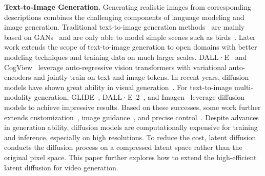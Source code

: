 \documentclass{article}
\begin{document}
\noindent\textbf{Text-to-Image Generation.}
Generating realistic images from corresponding descriptions combines the challenging components of language modeling and image generation.
Traditional text-to-image generation methods~\cite{2016T2I,ICML_16,AttnGAN,StackGAN,AI_Illustrator} are mainly based on GANs~\cite{GAN} and are only able to model simple scenes such as birds~\cite{WahCUB_200_2011}.
Later work extends the scope of text-to-image generation to open domains with better modeling techniques and training data on much larger scales.
DALL·E~\cite{dalle} and CogView~\cite{cogview} leverage auto-regressive vision transformers with variational auto-encoders and jointly train on text and image tokens.
In recent years, diffusion models have shown great ability in visual generation~\cite{2021ADM}.
For text-to-image multi-modality generation, GLIDE~\cite{2021GLIDE}, DALL·E~2~\cite{2022DALLE2}, and Imagen~\cite{imagen} leverage diffusion models to achieve impressive results. 
Based on these successes, some work further extends customization~\cite{2022DreamBooth,UnifiedMMLD2023}, image guidance~\cite{2023PaintbyExample}, and precise control~\cite{2022eDiff-I}.
Despite advances in generation ability, diffusion models are computationally expensive for training and inference, especially on high resolutions.
To reduce the cost, latent diffusion~\cite{2022LDM} conducts the diffusion process on a compressed latent space rather than the original pixel space.
This paper further explores how to extend the high-efficient latent diffusion for video generation.
\end{document}
